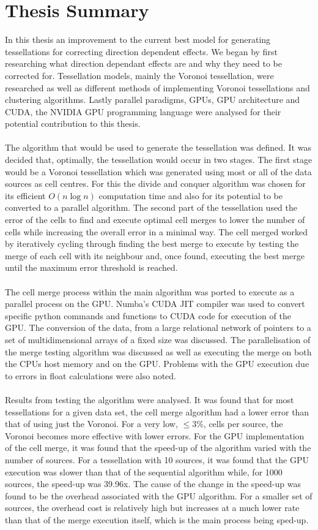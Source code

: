 \section{Thesis Summary}
In this thesis an improvement to the current best model for generating tessellations for correcting direction dependent effects. We began by first researching what direction dependant effects are and why they need to be corrected for. Tessellation models, mainly the Voronoi tessellation, were researched as well as different methods of implementing Voronoi tessellations and clustering algorithms. Lastly parallel paradigms, GPUs, GPU architecture and CUDA, the NVIDIA GPU programming language were analysed for their potential contribution to this thesis.
\\
\\
The algorithm that would be used to generate the tessellation was defined. It was decided that, optimally, the tessellation would occur in two stages. The first stage would be a Voronoi tessellation which was generated using most or all of the data sources as cell centres. For this the divide and conquer algorithm was chosen for its efficient $O(n\log n)$ computation time and also for its potential to be converted to a parallel algorithm. The second part of the tessellation used the error of the cells to find and execute optimal cell merges to lower the number of cells while increasing the overall error in a minimal way. The cell merged worked by iteratively cycling through finding the best merge to execute by testing the merge of each cell with its neighbour and, once found, executing the best merge until the maximum error threshold is reached.
\\
\\
The cell merge process within the main algorithm was ported to execute as a parallel process on the GPU. Numba's CUDA JIT compiler was used to convert specific python commands and functions to CUDA code for execution of the GPU. The conversion of the data, from a large relational network of pointers to a set of multidimensional arrays of a fixed size was discussed. The parallelisation of the merge testing algorithm was discussed as well as executing the merge on both the CPUs host memory and on the GPU. Problems with the GPU execution due to errors in float calculations were also noted.
\\
\\
Results from testing the algorithm were analysed. It was found that for most tessellations for a given data set, the cell merge algorithm had a lower error than that of using just the Voronoi. For a very low, $\leq 3\%$, cells per source, the Voronoi becomes more effective with lower errors. For the GPU implementation of the cell merge, it was found that the speed-up of the algorithm varied with the number of sources. For a tessellation with 10 sources, it was found that the GPU execution was slower than that of the sequential algorithm while, for 1000 sources, the speed-up was 39.96x. The cause of the change in the speed-up was found to be the overhead associated with the GPU algorithm. For a smaller set of sources, the overhead cost is relatively high but increases at a much lower rate than that of the merge execution itself, which is the main process being sped-up.